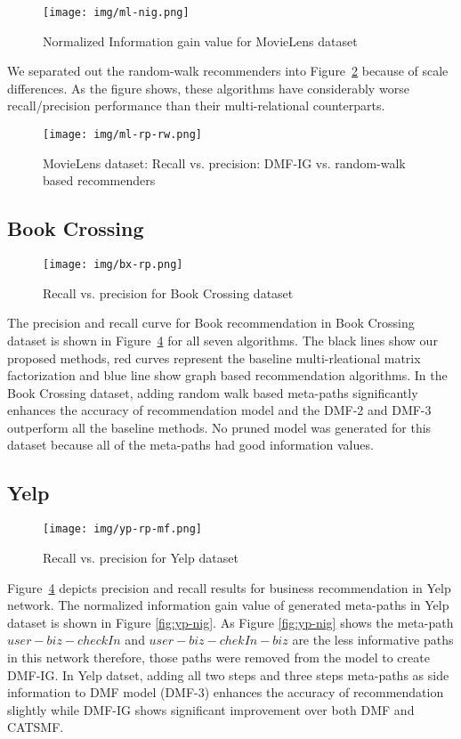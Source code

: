 \documentclass {acmart}
\begin{document}
\begin{figure}[tbh]
	\centering
	\texttt{[image: img/ml-nig.png]}
	\caption{\label{fig:ml-nig}Normalized Information gain value for MovieLens dataset}
\end{figure}

We separated out the random-walk recommenders into Figure~\ref{fig:MlresultRW} because of scale differences. As the figure shows, these algorithms have considerably worse recall/precision performance than their multi-relational counterparts.


\begin{figure}[tbh]
	\centering
	\texttt{[image: img/ml-rp-rw.png]}
	\caption{\label{fig:MlresultRW}MovieLens dataset: Recall vs. precision: DMF-IG vs. random-walk based recommenders}
\end{figure}

\subsection{Book Crossing}

\begin{figure}[tbh]
\centering
	\texttt{[image: img/bx-rp.png]}
	\caption{\label{fig:bx-rp}Recall vs. precision for Book Crossing dataset}
\end{figure}

The precision and recall curve for Book recommendation in Book Crossing dataset is shown in Figure~\ref{fig:yp-rp-mf}  for all seven algorithms. The black lines show our proposed methods, red curves represent the baseline multi-rleational matrix factorization and blue line show graph based recommendation algorithms. In the Book Crossing dataset, adding random walk based meta-paths significantly enhances the accuracy of recommendation model and the DMF-2 and DMF-3 outperform all the baseline methods. No pruned model was generated for this dataset because all of the meta-paths had good information values.


\subsection{Yelp}

\begin{figure}[tbh]
\centering
	\texttt{[image: img/yp-rp-mf.png]}
	\caption{\label{fig:yp-rp-mf}Recall vs. precision for Yelp dataset}
\end{figure}

Figure~\ref{fig:yp-rp-mf} depicts precision and recall results for business recommendation in Yelp network. The normalized information gain value of generated meta-paths in Yelp dataset is shown in Figure \ref{fig:yp-nig}. As Figure \ref{fig:yp-nig} shows the meta-path $user-biz-checkIn$ and $user-biz-chekIn-biz$ are the less informative paths in this network therefore, those paths were removed from the model to create DMF-IG. In Yelp datset, adding all two steps and three steps meta-paths as side information to DMF model (DMF-3) enhances the accuracy of recommendation slightly while DMF-IG shows significant improvement over both DMF and CATSMF.
\end{document}
